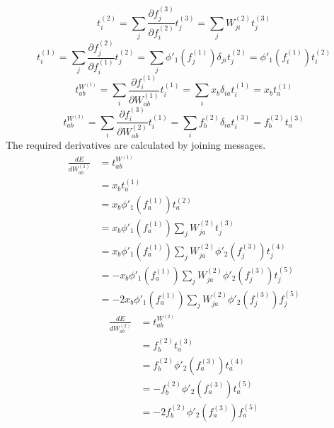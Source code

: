 \documentclass[fleqn]{report}
\begin{document}
\begin{equation}
    t^{(2)}_i = \sum_j \frac{\partial f^{(3)}_j}{\partial f^{(2)}_i} t^{(3)}_j = \sum_j W^{(2)}_{ji} t^{(3)}_j
\end{equation}
\begin{equation}
    t^{(1)}_i = \sum_j \frac{\partial f^{(2)}_j}{\partial f^{(1)}_i} t^{(2)}_j = \sum_j \phi'_1 \left ( f^{(1)}_j \right ) \delta_{ji} t^{(2)}_j = \phi'_1 \left ( f^{(1)}_i \right ) t^{(2)}_i
\end{equation}
\begin{equation}
    t^{W^{(1)}}_{ab} = \sum_i \frac{\partial f^{(1)}_i}{\partial W^{(1)}_{ab}} t^{(1)}_i = \sum_i x_b \delta_{ia} t^{(1)}_i = x_b t^{(1)}_a
\end{equation}
\begin{equation}
    t^{W^{(2)}}_{ab} = \sum_i \frac{\partial f^{(3)}_i}{\partial W^{(2)}_{ab}} t^{(1)}_i = \sum_i f^{(2)}_b \delta_{ia} t^{(3)}_i = f^{(2)}_b t^{(3)}_a
\end{equation}
The required derivatives are calculated by joining messages.
\begin{equation}
    \begin{split}
        \frac{d E}{d W^{(1)}_{ab}} & = t^{W^{(1)}}_{ab} \\
        & = x_b t^{(1)}_a \\
        & = x_b \phi'_1 \left ( f^{(1)}_a \right ) t^{(2)}_a \\
        & = x_b \phi'_1 \left ( f^{(1)}_a \right ) \sum_j W^{(2)}_{ja} t^{(3)}_j \\
        & = x_b \phi'_1 \left ( f^{(1)}_a \right ) \sum_j W^{(2)}_{ja} \phi'_2 \left ( f^{(3)}_j \right ) t^{(4)}_j \\
        & = - x_b \phi'_1 \left ( f^{(1)}_a \right ) \sum_j W^{(2)}_{ja} \phi'_2 \left ( f^{(3)}_j \right ) t^{(5)}_j \\
        & = - 2 x_b \phi'_1 \left ( f^{(1)}_a \right ) \sum_j W^{(2)}_{ja} \phi'_2 \left ( f^{(3)}_j \right ) f^{(5)}_j
    \end{split}
\end{equation}
\begin{equation}
    \begin{split}
        \frac{d E}{d W^{(2)}_{ab}} & = t^{W^{(2)}}_{ab} \\
        & = f^{(2)}_b t^{(3)}_a \\
        & = f^{(2)}_b \phi'_2 \left ( f^{(3)}_a \right ) t^{(4)}_a \\
        & = - f^{(2)}_b \phi'_2 \left ( f^{(3)}_a \right ) t^{(5)}_a \\
        & = - 2 f^{(2)}_b \phi'_2 \left ( f^{(3)}_a \right ) f^{(5)}_a \\
    \end{split}
\end{equation}
\end{document}
